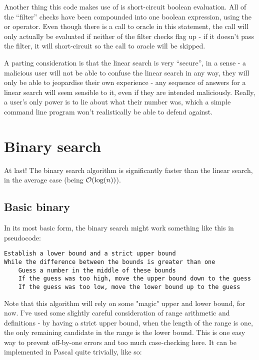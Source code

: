 \documentclass[fleqn,a4paper,11pt]{article}
\begin{document}
    Another thing this code makes use of is short-circuit boolean evaluation.
    All of the ``filter'' checks have been compounded into one boolean
    expression, using the or operator. Even though there is a call to oracle in
    this statement, the call will only actually be evaluated if neither of the
    filter checks flag up - if it doesn't pass the filter, it will short-circuit
    so the call to oracle will be skipped.

    A parting consideration is that the linear search is very ``secure'', in a
    sense - a malicious user will not be able to confuse the linear search in
    any way, they will only be able to jeopardise their own experience - any
    sequence of answers for a linear search will seem sensible to it, even if
    they are intended maliciously. Really, a user's only power is to lie about
    what their number was, which a simple command line program won't
    realistically be able to defend against.

    \section{Binary search}

    At last! The binary search algorithm is significantly faster than the
    linear search, in the average case (being \(\operatorname{\mathcal O}(\log(n))\)).

    \subsection{Basic binary}

    In its most basic form, the binary search might work something like this in
    pseudocode:

\begin{lstlisting}[caption=Basic binary search pseudocode]
Establish a lower bound and a strict upper bound
While the difference between the bounds is greater than one
    Guess a number in the middle of these bounds
    If the guess was too high, move the upper bound down to the guess
    If the guess was too low, move the lower bound up to the guess
\end{lstlisting}

    Note that this algorithm will rely on some "magic" upper and lower bound,
    for now. I've used some slightly careful consideration of range arithmetic
    and definitions - by having a strict upper bound, when the length of the
    range is one, the only remaining candidate in the range is the lower bound.
    This is one easy way to prevent off-by-one errors and too much
    case-checking here. It can be implemented in Pascal quite trivially, like
    so:
\end{document}
